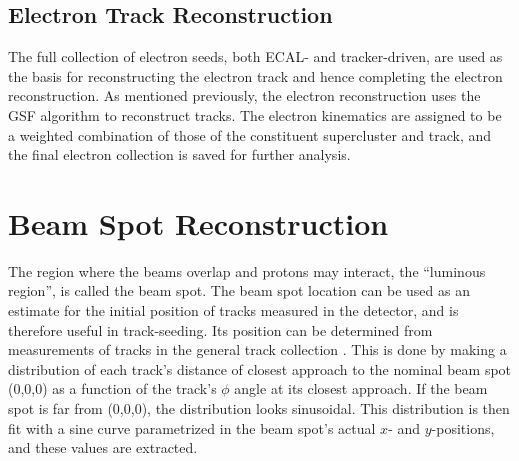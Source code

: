 \subsection{Electron Track Reconstruction}
\label{evReco:elecTrk}

The full collection of electron seeds, 
both ECAL- and tracker-driven, 
are used as the basis for reconstructing 
the electron track and hence 
completing the electron reconstruction.  
As mentioned previously, 
the electron reconstruction uses the 
GSF algorithm to reconstruct tracks.  
The electron kinematics are 
assigned to be a weighted combination 
of those of the constituent supercluster 
and track, 
and the final electron collection 
is saved for further analysis.  




\section{Beam Spot Reconstruction}
\label{evReco:BS}
The region where the beams overlap and protons may interact, 
the ``luminous region'', is called the beam spot.  
The beam spot location can be used as an estimate 
for the initial position of tracks measured in the detector, 
and is therefore useful in track-seeding.  
Its position %
can be determined from measurements of tracks in the 
general track collection 
\cite{CMS-NOTE-2007-021}.  
This is done by making a distribution of each track's distance of 
closest approach to the nominal beam spot (0,0,0) 
as a function of the track's $\phi$ angle at its 
closest approach.  
If the beam spot is far from (0,0,0), 
the distribution looks sinusoidal.  
This distribution is then fit with a sine curve 
parametrized in the beam spot's actual 
$x$- and $y$-positions, 
and these values are extracted.  

